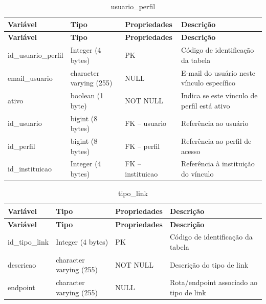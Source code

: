 \fonteautores

\vspace{\baselineskip}

\Needspace{0.32\textheight}
\begin{longtable}{|L{5.2cm}|L{3.2cm}|L{2.4cm}|L{3.4cm}|}
\caption{usuario\_perfil} \\
\hline
\textbf{Variável} & \textbf{Tipo} & \textbf{Propriedades} & \textbf{Descrição} \\
\hline
\endfirsthead
\hline
\textbf{Variável} & \textbf{Tipo} & \textbf{Propriedades} & \textbf{Descrição} \\
\hline
\endhead
id\_usuario\_perfil & Integer (4 bytes) & PK & Código de identificação da tabela \\
\hline
email\_usuario & character varying (255) & NULL & E-mail do usuário neste vínculo específico \\
\hline
ativo & boolean (1 byte) & NOT NULL & Indica se este vínculo de perfil está ativo \\
\hline
id\_usuario & bigint (8 bytes) & FK – usuario & Referência ao usuário \\
\hline
id\_perfil & bigint (8 bytes) & FK – perfil & Referência ao perfil de acesso \\
\hline
id\_instituicao & Integer (4 bytes) & FK – instituicao & Referência à instituição do vínculo \\
\hline
\end{longtable}

\fonteautores

\vspace{\baselineskip}

\Needspace{0.32\textheight}
\begin{longtable}{|L{5.2cm}|L{3.2cm}|L{2.4cm}|L{3.4cm}|}
\caption{tipo\_link} \\
\hline
\textbf{Variável} & \textbf{Tipo} & \textbf{Propriedades} & \textbf{Descrição} \\
\hline
\endfirsthead
\hline
\textbf{Variável} & \textbf{Tipo} & \textbf{Propriedades} & \textbf{Descrição} \\
\hline
\endhead
id\_tipo\_link & Integer (4 bytes) & PK & Código de identificação da tabela \\
\hline
descricao & character varying (255) & NOT NULL & Descrição do tipo de link \\
\hline
endpoint & character varying (255) & NULL & Rota/endpoint associado ao tipo de link \\
\hline
\end{longtable}

